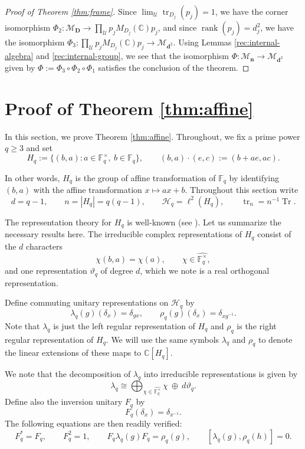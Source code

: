 \documentclass[12pt]{amsart}
\numberwithin{equation}{section}
\theoremstyle{definition}
\def\bb{\mathbb}
\def\cal{\mathcal}
\def\M{\mathcal{M}}
\DeclareMathOperator{\tr}{tr}
\newcommand\cU{{\cal U}}
\def \M{\mathcal{M}}
\begin{document}
\begin{proof}[Proof of Theorem \ref{thm:frame}]
Since $\lim_\cU \tr_{D_j}(p_j)=1$, we have the corner isomorphism $\Phi_2:\M_{\mathbf{D}}\to \prod_\cU p_jM_{D_j}(\bb C)p_j$, and since $\operatorname{rank}(p_j)=d_j^2$, we have the isomorphism $\Phi_3:\prod_{\cU}p_jM_{D_j}(\bb C)p_j\to \M_{\mathbf{d}^2}$.  Using Lemmas \ref{rec:internal-algebra} and \ref{rec:internal-group}, we see that the isomorphism $\Phi:\M_{\mathbf{n}}\to \M_{\mathbf{d}^2}$ given by $\Phi:=\Phi_3\circ\Phi_2\circ \Phi_1$ satisfies the conclusion of the theorem.
\end{proof}

\section{Proof of Theorem \ref{thm:affine}}\label{sec:affine}

In this section, we prove Theorem \ref{thm:affine}.  Throughout, we fix a prime power $q\geq 3$ and set
\[
 H_q:=\{(b,a):a\in\mathbb F_q^\times,\ b\in\mathbb F_q\},
 \qquad (b,a)\cdot (e,c):=(b+ae,ac).
\]

In other words, $H_q$ is the group of affine transformation of $\mathbb{F}_q$ by identifying ${(b,a)}$ with the affine transformation $x\mapsto ax+b$.
Throughout this section write
\[
 d=q-1,\qquad n=|H_q|=q(q-1),\qquad
 \mathcal H_q=\ell^2(H_q),\qquad
 \tr_n=n^{-1}\operatorname{Tr}.
\]

The representation theory for $H_q$ is well-known (see \cite[Chapter 25]{james2001representations}).  Let us summarize the necessary results here.  The irreducible complex representations of $H_q$ consist of the $d$
characters
\[
 \chi({b,a})=\chi(a),\qquad
 \chi\in\widehat{\mathbb F_q^\times},
\]
and one representation $\vartheta_q$ of degree $d$, which we note is a real orthogonal representation.

Define commuting unitary representations on $\mathcal H_q$ by
\[
 \lambda_q(g)(\delta_x)=\delta_{gx},\qquad
 \rho_q(g)(\delta_x)=\delta_{xg^{-1}}.
\]
Note that $\lambda_q$ is just the left regular representation of $H_q$ and $\rho_q$ is the right regular representation of $H_q$.  We will use the same symbols $\lambda_q$ and $\rho_q$ to denote the linear
extensions of these maps to $\bb C[H_q]$.  

We note that the decomposition of $\lambda_q$ into irreducible representations is given by 
\[
\lambda_q\cong \bigoplus_{\chi\in\widehat{\mathbb F_q^\times}}\chi
                 \ \oplus\ d\vartheta_q.
\]
Define also the inversion unitary $F_q$ by
\[
 F_q(\delta_x)=\delta_{x^{-1}}.
\]
The following equations are then readily verified:
\begin{equation}
\label{aff:flip-identities}
 F_q^*=F_q,\qquad F_q^2=1,\qquad
 F_q\lambda_q(g)F_q=\rho_q(g),\qquad [\lambda_q(g),\rho_q(h)]=0.
\end{equation}
\end{document}
